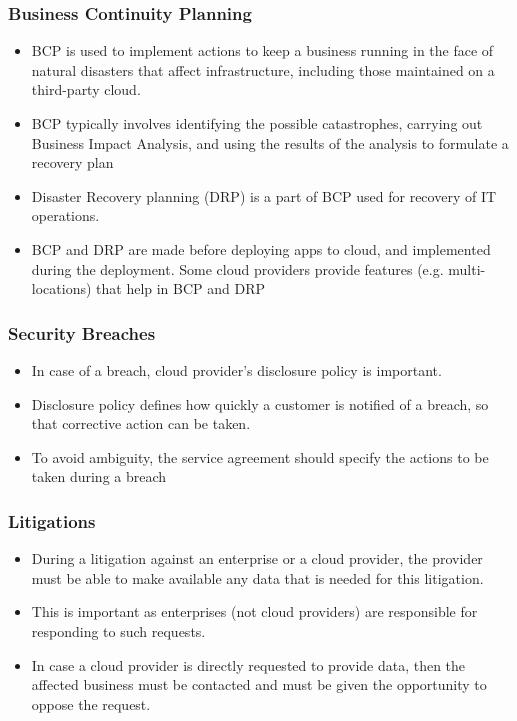 \documentclass{article}
\begin{document}
\subsubsection{Business Continuity Planning}
\begin{itemize}
    \item BCP is used to implement actions to keep a business running in the face of natural disasters that affect infrastructure, including those maintained on a third-party cloud. 
    
    \item BCP typically involves identifying the possible catastrophes, carrying out Business Impact Analysis, and using the results of the analysis to formulate a recovery plan
    
    \item Disaster Recovery planning (DRP) is a part of BCP used for recovery of IT operations. 
    
    \item BCP and DRP are made before deploying apps to cloud, and implemented during the deployment. Some cloud providers provide features (e.g. multi-locations) that help in BCP and DRP
\end{itemize}

\subsubsection{Security Breaches}
\begin{itemize}
    \item In case of a breach, cloud provider's disclosure policy is important. 
    
    \item Disclosure policy defines how quickly a customer is notified of a breach, so that corrective action can be taken. 
    
    \item To avoid ambiguity, the service agreement should specify the actions to be taken during a breach
\end{itemize}

\subsubsection{Litigations}
\begin{itemize}
    \item During a litigation against an enterprise or a cloud provider, the provider must be able to make available any data that is needed for this litigation. 
    
    \item This is important as enterprises (not cloud providers) are responsible for responding to such requests. 
    
    \item In case a cloud provider is directly requested to provide data, then the affected business must be contacted and must be given the opportunity to oppose the request. 
\end{itemize}
\end{document}
